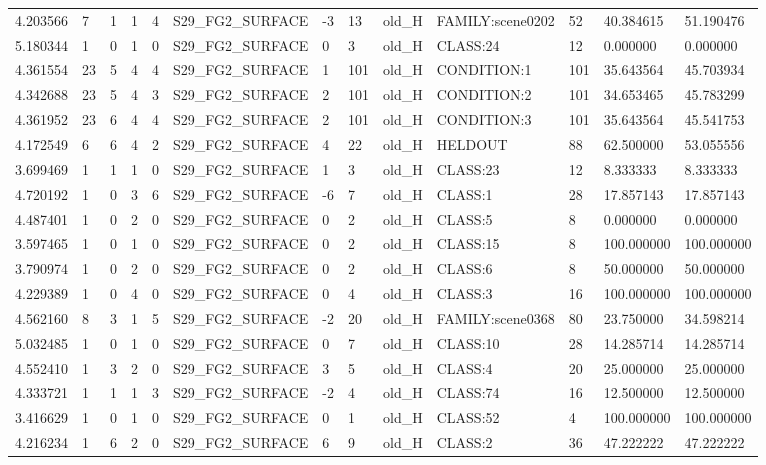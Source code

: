 \begin{tabular}{lllllllllllll}
4.203566 & 7 & 1 & 1 & 4 & S29\_FG2\_SURFACE & -3 & 13 & old\_H & FAMILY:scene0202 & 52 & 40.384615 & 51.190476 \\
5.180344 & 1 & 0 & 1 & 0 & S29\_FG2\_SURFACE & 0 & 3 & old\_H & CLASS:24 & 12 & 0.000000 & 0.000000 \\
4.361554 & 23 & 5 & 4 & 4 & S29\_FG2\_SURFACE & 1 & 101 & old\_H & CONDITION:1 & 101 & 35.643564 & 45.703934 \\
4.342688 & 23 & 5 & 4 & 3 & S29\_FG2\_SURFACE & 2 & 101 & old\_H & CONDITION:2 & 101 & 34.653465 & 45.783299 \\
4.361952 & 23 & 6 & 4 & 4 & S29\_FG2\_SURFACE & 2 & 101 & old\_H & CONDITION:3 & 101 & 35.643564 & 45.541753 \\
4.172549 & 6 & 6 & 4 & 2 & S29\_FG2\_SURFACE & 4 & 22 & old\_H & HELDOUT & 88 & 62.500000 & 53.055556 \\
3.699469 & 1 & 1 & 1 & 0 & S29\_FG2\_SURFACE & 1 & 3 & old\_H & CLASS:23 & 12 & 8.333333 & 8.333333 \\
4.720192 & 1 & 0 & 3 & 6 & S29\_FG2\_SURFACE & -6 & 7 & old\_H & CLASS:1 & 28 & 17.857143 & 17.857143 \\
4.487401 & 1 & 0 & 2 & 0 & S29\_FG2\_SURFACE & 0 & 2 & old\_H & CLASS:5 & 8 & 0.000000 & 0.000000 \\
3.597465 & 1 & 0 & 1 & 0 & S29\_FG2\_SURFACE & 0 & 2 & old\_H & CLASS:15 & 8 & 100.000000 & 100.000000 \\
3.790974 & 1 & 0 & 2 & 0 & S29\_FG2\_SURFACE & 0 & 2 & old\_H & CLASS:6 & 8 & 50.000000 & 50.000000 \\
4.229389 & 1 & 0 & 4 & 0 & S29\_FG2\_SURFACE & 0 & 4 & old\_H & CLASS:3 & 16 & 100.000000 & 100.000000 \\
4.562160 & 8 & 3 & 1 & 5 & S29\_FG2\_SURFACE & -2 & 20 & old\_H & FAMILY:scene0368 & 80 & 23.750000 & 34.598214 \\
5.032485 & 1 & 0 & 1 & 0 & S29\_FG2\_SURFACE & 0 & 7 & old\_H & CLASS:10 & 28 & 14.285714 & 14.285714 \\
4.552410 & 1 & 3 & 2 & 0 & S29\_FG2\_SURFACE & 3 & 5 & old\_H & CLASS:4 & 20 & 25.000000 & 25.000000 \\
4.333721 & 1 & 1 & 1 & 3 & S29\_FG2\_SURFACE & -2 & 4 & old\_H & CLASS:74 & 16 & 12.500000 & 12.500000 \\
3.416629 & 1 & 0 & 1 & 0 & S29\_FG2\_SURFACE & 0 & 1 & old\_H & CLASS:52 & 4 & 100.000000 & 100.000000 \\
4.216234 & 1 & 6 & 2 & 0 & S29\_FG2\_SURFACE & 6 & 9 & old\_H & CLASS:2 & 36 & 47.222222 & 47.222222 \\

\end{tabular}
